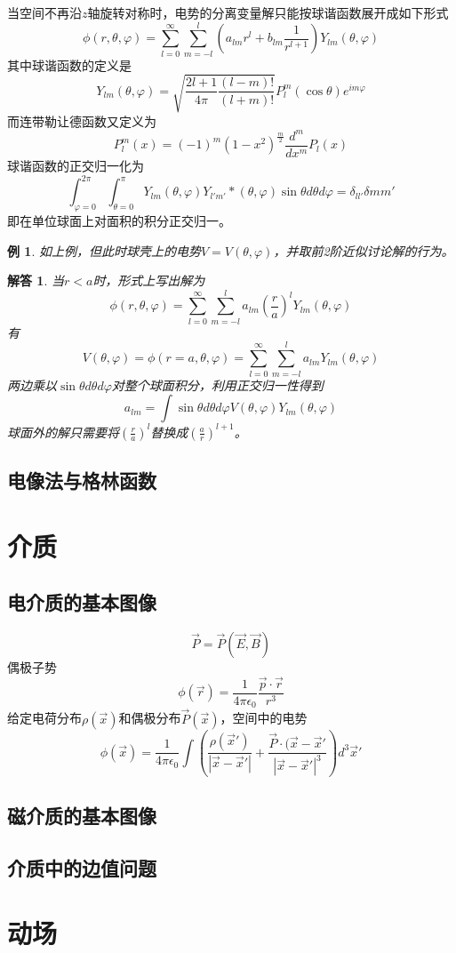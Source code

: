 \documentclass[a4paper,11pt]{ctexart}
\newtheorem{eg}{例}[section]
\newtheorem{ans}{解答}[section]
\newcommand{\beq}{\begin{equation}}
\newcommand{\eeq}{\end{equation}}
\newcommand{\epv}{\epsilon_0}
\begin{document}
\par
当空间不再沿$z$轴旋转对称时，电势的分离变量解只能按球谐函数展开成如下形式
\beq
\phi(r,\theta,\varphi) =\sum_{l=0}^\infty \sum_{m=-l}^{l} \left( a_{lm} r^l + b_{lm} \frac{1}{r^{l+1}}\right) Y_{lm}(\theta,\varphi)
\eeq
其中球谐函数的定义是
\beq
Y_{lm}(\theta,\varphi) = \sqrt{ \frac{2l+1}{4\pi} \frac{(l-m)!}{(l+m)!}} P_l^m(\cos \theta) e^{im\varphi}
\eeq
而连带勒让德函数又定义为
\beq
P_l^m (x) = (-1)^m (1-x^2)^{\frac{m}{2}} \frac{d^m}{dx^m} P_l(x)
\eeq
球谐函数的正交归一化为
\beq
\int_{\varphi = 0}^{2\pi} \int_{\theta = 0}^\pi Y_{lm}(\theta,\varphi) Y_{l'm'}*(\theta,\varphi) \sin \theta d\theta d \varphi = \delta_{ll'} \delta{mm'}
\eeq
即在单位球面上对面积的积分正交归一。
\begin{eg}
如上例，但此时球壳上的电势$V=V(\theta,\varphi)$，并取前2阶近似讨论解的行为。
\end{eg}
\begin{ans}
当$r<a$时，形式上写出解为
\beq
\phi(r,\theta,\varphi) =\sum_{l=0}^\infty \sum_{m=-l}^{l} a_{lm} \left( \frac{r}{a} \right)^lY_{lm}(\theta,\varphi)
\eeq
有
\beq
V(\theta,\varphi) = \phi(r=a,\theta,\varphi) = \sum_{l=0}^\infty \sum_{m=-l}^{l} a_{lm} Y_{lm}(\theta,\varphi)
\eeq
两边乘以$\sin \theta d\theta d \varphi$对整个球面积分，利用正交归一性得到
\beq
a_{lm} = \int \sin \theta d \theta d \varphi V(\theta,\varphi) Y_{lm}(\theta,\varphi)
\eeq
球面外的解只需要将$\left(\frac{r}{a}\right)^l$替换成$\left( \frac{a}{r}\right)^{l+1}$。
 
 
\end{ans}


\subsection{电像法与格林函数}


\section{介质}
\subsection{电介质的基本图像}
\beq
\vec{P} = \vec P ( \vec E,\vec B)
\eeq
偶极子势
\beq
\phi(\vec r) = \frac{1}{4\pi \epv} \frac{\vec p \cdot \vec r}{r^3}
\eeq
给定电荷分布$\rho(\vec x)$和偶极分布$\vec P (\vec x)$，空间中的电势
\beq
\phi(\vec x) =  \frac{1}{4\pi \epv}  \int \left(\frac{\rho(\vec{x}')}{|\vec x - \vec{x}'|} + \frac{\vec P \cdot (\vec{x} - \vec{x}'}{|\vec x - \vec{x}'|^3} \right) d^3 \vec{x}'
\eeq
\subsection{磁介质的基本图像}
\subsection{介质中的边值问题}



\section{动场}




	
\end{document}

